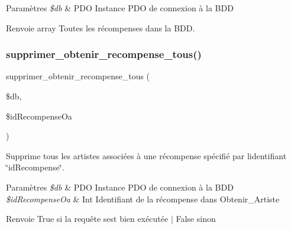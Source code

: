 \begin{DoxyParams}{Paramètres}
{\em \$db} & P\+DO Instance P\+DO de connexion à la B\+DD \\
\hline
\end{DoxyParams}
\begin{DoxyReturn}{Renvoie}
array Toutes les récompenses dans la B\+DD. 
\end{DoxyReturn}
\mbox{\label{fonctionRecompense_8php_a16ae3dcef74e4658db290ad2c4c53eed}} 
\subsubsection{\texorpdfstring{supprimer\+\_\+obtenir\+\_\+recompense\+\_\+tous()}{supprimer\_obtenir\_recompense\_tous()}}
{\footnotesize\ttfamily supprimer\+\_\+obtenir\+\_\+recompense\+\_\+tous (\begin{DoxyParamCaption}\item[{}]{\$db,  }\item[{}]{\$id\+Recompense\+Oa }\end{DoxyParamCaption})}



Supprime tous les artistes associées à une récompense spécifié par l\textquotesingle{}identifiant \char`\"{}id\+Recompense\char`\"{}. 


\begin{DoxyParams}{Paramètres}
{\em \$db} & P\+DO Instance P\+DO de connexion à la B\+DD \\
\hline
{\em \$id\+Recompense\+Oa} & Int Identifiant de la récompense dans Obtenir\+\_\+\+Artiste \\
\hline
\end{DoxyParams}
\begin{DoxyReturn}{Renvoie}
True si la requête s\textquotesingle{}est bien exécutée $\vert$ False sinon 
\end{DoxyReturn}
\mbox{\label{fonctionRecompense_8php_a270bb87b64f754522b50f646626646f8}} 
